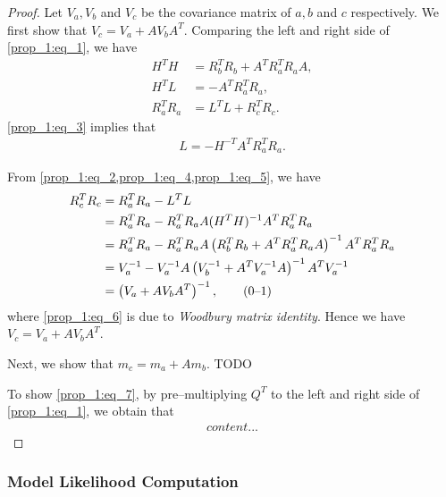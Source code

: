 \documentclass[microtype]{gtpart}     %
\theoremstyle{definition}
\newcommand\numberthis{\addtocounter{equation}{1}\tag{\theequation}}
\begin{document}
\begin{proof}
	Let $V_a, V_b$ and $V_c$ be the covariance matrix of $a, b$ and $c$ respectively.
	We first show that $V_c = V_a + A V_b A^T$.
	Comparing the left and right side of \cref{prop_1:eq_1}, we have
	\begin{align}
		H^TH &= R^T_b R_b + A^T R^T_a R_a A, \label{prop_1:eq_2}\\
		H^TL &= -A^T R^T_a R_a, \label{prop_1:eq_3}\\
		R^T_a R_a &= L^T L + R^T_c R_c. \label{prop_1:eq_4}
	\end{align}
	\cref{prop_1:eq_3} implies that
	\begin{align}
		L = - H^{-T} A^T R^T_a R_a. \label{prop_1:eq_5}
	\end{align}
	
	From \cref{prop_1:eq_2,prop_1:eq_4,prop_1:eq_5}, we have
	\begin{align*}
		R^T_c R_c 	&= R^T_a R_a - L^T L \\
					&= R^T_a R_a - R^T_a R_a A (H^TH)^{-1} A^T R^T_a R_a \\
					&= R^T_a R_a - R^T_a R_a A \left( R^T_b R_b + A^T R^T_a R_a A \right)^{-1} A^T R^T_a R_a \\
					&= V_a^{-1} - V_a^{-1} A \left( V_b^{-1} + A^T V_a^{-1} A \right)^{-1} A^T V_a^{-1} \\
					&= \left( V_a + A V_b A^T \right)^{-1}, \numberthis\label{prop_1:eq_6}
	\end{align*}
	where \cref{prop_1:eq_6} is due to \textit{Woodbury matrix identity}.
	Hence we have $V_c = V_a + A V_b A^T$.
	
	Next, we show that $m_c = m_a + A m_b$. TODO
	
	To show \cref{prop_1:eq_7}, by pre--multiplying $Q^T$ to the left and right side of \cref{prop_1:eq_1}, we obtain that
	\begin{align*}
	content...
	\end{align*}
	
\end{proof}



\subsubsection{Model Likelihood Computation}

%
%
%


%


\end{document}
